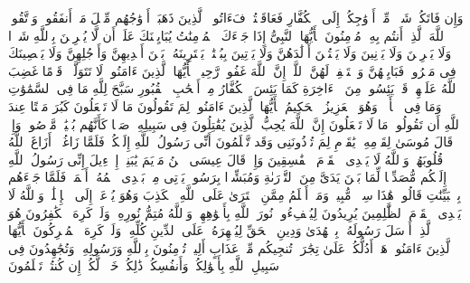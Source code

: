 \stopbuffer
\startbuffer[\q:60:11]
وَإِن فَاتَكُمۡ شَیۡءࣱ مِّنۡ أَزۡوَٰجِكُمۡ إِلَى ٱلۡكُفَّارِ فَعَاقَبۡتُمۡ فَءَاتُوا۟ ٱلَّذِینَ ذَهَبَتۡ أَزۡوَٰجُهُم مِّثۡلَ مَاۤ أَنفَقُوا۟ۚ وَٱتَّقُوا۟ ٱللَّهَ ٱلَّذِیۤ أَنتُم بِهِۦ مُؤۡمِنُونَ%
\stopbuffer
\startbuffer[\q:60:12]
یَٰۤأَیُّهَا ٱلنَّبِیُّ إِذَا جَاۤءَكَ ٱلۡمُؤۡمِنَٰتُ یُبَایِعۡنَكَ عَلَىٰۤ أَن لَّا یُشۡرِكۡنَ بِٱللَّهِ شَیۡءࣰا وَلَا یَسۡرِقۡنَ وَلَا یَزۡنِینَ وَلَا یَقۡتُلۡنَ أَوۡلَٰدَهُنَّ وَلَا یَأۡتِینَ بِبُهۡتَٰنࣲ یَفۡتَرِینَهُۥ بَیۡنَ أَیۡدِیهِنَّ وَأَرۡجُلِهِنَّ وَلَا یَعۡصِینَكَ فِی مَعۡرُوفࣲ فَبَایِعۡهُنَّ وَٱسۡتَغۡفِرۡ لَهُنَّ ٱللَّهَۚ إِنَّ ٱللَّهَ غَفُورࣱ رَّحِیمࣱ%
\stopbuffer
\startbuffer[\q:60:13]
یَٰۤأَیُّهَا ٱلَّذِینَ ءَامَنُوا۟ لَا تَتَوَلَّوۡا۟ قَوۡمًا غَضِبَ ٱللَّهُ عَلَیۡهِمۡ قَدۡ یَئِسُوا۟ مِنَ ٱلۡءَاخِرَةِ كَمَا یَئِسَ ٱلۡكُفَّارُ مِنۡ أَصۡحَٰبِ ٱلۡقُبُورِ%
\stopbuffer
\startbuffer[\q:61:1]
سَبَّحَ لِلَّهِ مَا فِی ٱلسَّمَٰوَٰتِ وَمَا فِی ٱلۡأَرۡضِۖ وَهُوَ ٱلۡعَزِیزُ ٱلۡحَكِیمُ%
\stopbuffer
\startbuffer[\q:61:2]
یَٰۤأَیُّهَا ٱلَّذِینَ ءَامَنُوا۟ لِمَ تَقُولُونَ مَا لَا تَفۡعَلُونَ%
\stopbuffer
\startbuffer[\q:61:3]
كَبُرَ مَقۡتًا عِندَ ٱللَّهِ أَن تَقُولُوا۟ مَا لَا تَفۡعَلُونَ%
\stopbuffer
\startbuffer[\q:61:4]
إِنَّ ٱللَّهَ یُحِبُّ ٱلَّذِینَ یُقَٰتِلُونَ فِی سَبِیلِهِۦ صَفࣰّا كَأَنَّهُم بُنۡیَٰنࣱ مَّرۡصُوصࣱ%
\stopbuffer
\startbuffer[\q:61:5]
وَإِذۡ قَالَ مُوسَىٰ لِقَوۡمِهِۦ یَٰقَوۡمِ لِمَ تُؤۡذُونَنِی وَقَد تَّعۡلَمُونَ أَنِّی رَسُولُ ٱللَّهِ إِلَیۡكُمۡۖ فَلَمَّا زَاغُوۤا۟ أَزَاغَ ٱللَّهُ قُلُوبَهُمۡۚ وَٱللَّهُ لَا یَهۡدِی ٱلۡقَوۡمَ ٱلۡفَٰسِقِینَ%
\stopbuffer
\startbuffer[\q:61:6]
وَإِذۡ قَالَ عِیسَى ٱبۡنُ مَرۡیَمَ یَٰبَنِیۤ إِسۡرَٰۤءِیلَ إِنِّی رَسُولُ ٱللَّهِ إِلَیۡكُم مُّصَدِّقࣰا لِّمَا بَیۡنَ یَدَیَّ مِنَ ٱلتَّوۡرَىٰةِ وَمُبَشِّرَۢا بِرَسُولࣲ یَأۡتِی مِنۢ بَعۡدِی ٱسۡمُهُۥۤ أَحۡمَدُۖ فَلَمَّا جَاۤءَهُم بِٱلۡبَیِّنَٰتِ قَالُوا۟ هَٰذَا سِحۡرࣱ مُّبِینࣱ%
\stopbuffer
\startbuffer[\q:61:7]
وَمَنۡ أَظۡلَمُ مِمَّنِ ٱفۡتَرَىٰ عَلَى ٱللَّهِ ٱلۡكَذِبَ وَهُوَ یُدۡعَىٰۤ إِلَى ٱلۡإِسۡلَٰمِۚ وَٱللَّهُ لَا یَهۡدِی ٱلۡقَوۡمَ ٱلظَّٰلِمِینَ%
\stopbuffer
\startbuffer[\q:61:8]
یُرِیدُونَ لِیُطۡفِءُوا۟ نُورَ ٱللَّهِ بِأَفۡوَٰهِهِمۡ وَٱللَّهُ مُتِمُّ نُورِهِۦ وَلَوۡ كَرِهَ ٱلۡكَٰفِرُونَ%
\stopbuffer
\startbuffer[\q:61:9]
هُوَ ٱلَّذِیۤ أَرۡسَلَ رَسُولَهُۥ بِٱلۡهُدَىٰ وَدِینِ ٱلۡحَقِّ لِیُظۡهِرَهُۥ عَلَى ٱلدِّینِ كُلِّهِۦ وَلَوۡ كَرِهَ ٱلۡمُشۡرِكُونَ%
\stopbuffer
\startbuffer[\q:61:10]
یَٰۤأَیُّهَا ٱلَّذِینَ ءَامَنُوا۟ هَلۡ أَدُلُّكُمۡ عَلَىٰ تِجَٰرَةࣲ تُنجِیكُم مِّنۡ عَذَابٍ أَلِیمࣲ%
\stopbuffer
\startbuffer[\q:61:11]
تُؤۡمِنُونَ بِٱللَّهِ وَرَسُولِهِۦ وَتُجَٰهِدُونَ فِی سَبِیلِ ٱللَّهِ بِأَمۡوَٰلِكُمۡ وَأَنفُسِكُمۡۚ ذَٰلِكُمۡ خَیۡرࣱ لَّكُمۡ إِن كُنتُمۡ تَعۡلَمُونَ%
